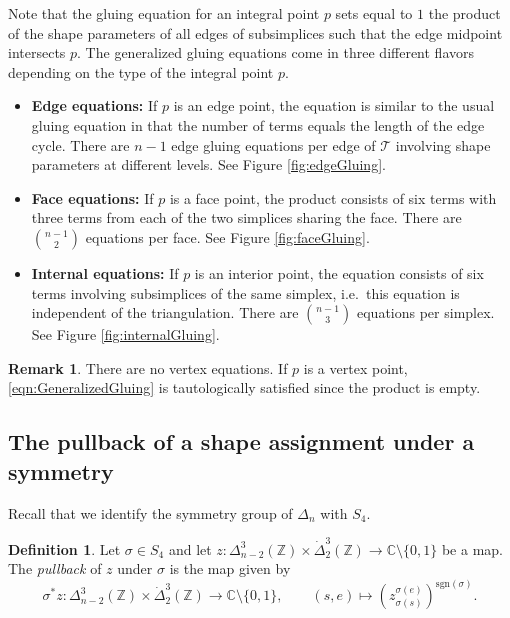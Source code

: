\documentclass[12pt]{amsart}
\theoremstyle{definition}
\newtheorem{definition}[theorem]{Definition}
\newtheorem{remark}[theorem]{Remark}
\numberwithin{equation}{section}
\def\sgn{\mathrm{sgn}}
\def\Z{\mathbb{Z}}
\def\C{\mathbb{C}}
\begin{document}
 Note that the gluing equation for an integral point $p$ sets equal to $1$ the product of the shape parameters of all edges of subsimplices such that the edge midpoint intersects $p$.
The generalized gluing equations come in three different flavors depending on the type of the integral point $p$.
\begin{itemize}
\item {\bf Edge equations:} If $p$ is an edge point, the equation is similar to the usual gluing equation in that the number of terms equals the length of the edge cycle. There are $n-1$ edge gluing equations per edge of $\mathcal{T}$ involving shape parameters at different levels. See Figure \ref{fig:edgeGluing}.
\item {\bf Face equations:} If $p$ is a face point, the product consists of six terms with three terms from each of the two simplices sharing the face. There are $\binom{n-1}{2}$ equations per face. See Figure \ref{fig:faceGluing}.

\item {\bf Internal equations:} If $p$ is an interior point, the equation consists of six terms involving subsimplices of the same simplex, i.e.~this equation is independent of the triangulation. There are $\binom{n-1}{3}$ equations per simplex. See Figure \ref{fig:internalGluing}.
\end{itemize}

\begin{remark}
There are no vertex equations. If $p$ is a vertex point, \eqref{eqn:GeneralizedGluing} is tautologically satisfied since the product is empty. 
\end{remark}



\subsection{The pullback of a shape assignment under a symmetry}




Recall that we identify the symmetry group of $\Delta_n$ with $S_4$.

\begin{definition}\label{def:PullbackShapes}
Let $\sigma\in S_4$ and let $z\colon\Delta^3_{n-2}(\Z)\times\dot\Delta^3_2(\Z)\to \C\setminus\{0,1\}$ be a map. 
The \emph{pullback} of $z$ under $\sigma$ is the map given by
\begin{equation}\label{actiononshapeassignments}
\sigma^*z\colon \Delta^3_{n-2}(\Z)\times\dot\Delta^3_2(\Z)\to\C\setminus\{0,1\},\qquad (s,e)\mapsto (z^{\sigma(e)}_{\sigma (s)})^{\sgn(\sigma)}.
\end{equation}
\end{definition}
\end{document}
